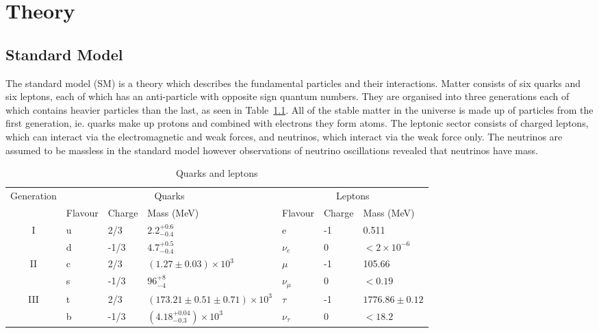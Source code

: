 \chapter{Theory}
\label{c:theory}

\section{Standard Model}

The standard model (SM) is a theory which describes the fundamental particles and their interactions. Matter consists of six quarks and six leptons, each of which has an anti-particle with opposite sign quantum numbers. They are organised into three generations each of which contains heavier particles than the last, as seen in Table~\ref{table:SMmatter}. All of the stable matter in the universe is made up of particles from the first generation, ie. quarks make up protons and combined with electrons they form atoms. The leptonic sector consists of charged leptons, which can interact via the electromagnetic and weak forces, and neutrinos, which interact via the weak force only. The neutrinos are assumed to be massless in the standard model however observations of neutrino oscillations revealed that neutrinos have mass.

\begin{table}[ht!]
\centering
\caption{Quarks and leptons}
\label{table:SMmatter}
\footnotesize
\begin{tabular}{|c|l|l|l|l|l|l|}
\hline
\multirow{2}{*}{Generation} & \multicolumn{3}{c|}{Quarks}                             & \multicolumn{3}{c|}{Leptons}              \\ \cline{2-7} 
                            & Flavour & Charge & Mass (MeV)                           & Flavour      & Charge & Mass (MeV)        \\ \hline
\hline

\multirow{2}{*}{I}          & u       & 2/3    & $2.2^{+0.6}_{-0.4}$                  & e            & -1     & 0.511             \\
                            & d       & -1/3   & $4.7^{+0.5}_{-0.4}$                  & $\nu_{e}$    & 0      & $<2\times10^{-6}$ \\ \hline
\multirow{2}{*}{II}         & c       & 2/3    & $(1.27\pm 0.03)\times10^{3}$         & $\mu$        & -1     & 105.66            \\
                            & s       & -1/3   & $96^{+8}_{-4}$                       & $\nu_{\mu}$  & 0      & $<0.19$           \\ \hline
\multirow{2}{*}{III}        & t       & 2/3    & $(173.21\pm0.51\pm0.71)\times10^{3}$ & $\tau$       & -1     & $1776.86\pm0.12$  \\
                            & b       & -1/3   & $(4.18^{+0.04}_{-0.3})\times10^{3}$  & $\nu_{\tau}$ & 0      & $<18.2$           \\ \hline
\end{tabular}
\end{table}

